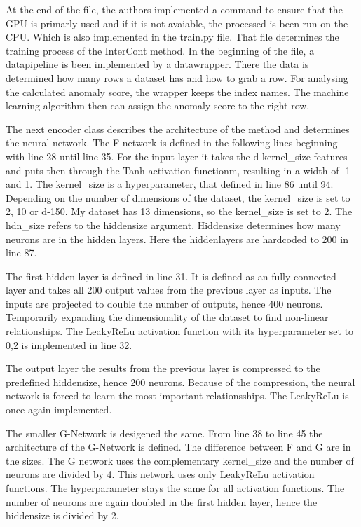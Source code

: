 At the end of the file, the authors implemented a command to ensure that the GPU is primarly used and if it is not avaiable, the processed is been run on the CPU.
Which is also implemented in the train.py file. 
That file determines the training process of the InterCont method.
In the beginning of the file, a datapipeline is been implemented by a datawrapper. 
There the data is determined how many rows a dataset has and how to grab a row. 
For analysing the calculated anomaly score, the wrapper keeps the index names.
The machine learning algorithm then can assign the anomaly score to the right row.


The next encoder class describes the architecture of the method and determines the neural network.
The F network is defined in the following lines beginning with line 28 until line 35.
For the input layer it takes the d-kernel\_size features and puts then through the Tanh activation functionm, resulting in a width of -1 and 1.
The kernel\_size is a hyperparameter, that defined in line 86 until 94. 
Depending on the number of dimensions of the dataset, the kernel\_size is set to 2, 10 or d-150. 
My dataset has 13 dimensions, so the kernel\_size is set to 2.
The hdn\_size refers to the hiddensize argument.
Hiddensize determines how many neurons are in the hidden layers.
Here the hiddenlayers are hardcoded to 200 in line 87. 


The first hidden layer is defined in line 31.
It is defined as an fully connected layer and takes all 200 output values from the previous layer as inputs.
The inputs are projected to double the number of outputs, hence 400 neurons.
Temporarily expanding the dimensionality of the dataset to find non-linear relationships.
The LeakyReLu activation function with its hyperparameter set to 0,2 is implemented in line 32.


The output layer the results from the previous layer is compressed to the predefined hiddensize, hence 200 neurons. 
Because of the compression, the neural network is forced to learn the most important relationsships.
The LeakyReLu is once again implemented.


The smaller G-Network is desigened the same.
From line 38 to line 45 the architecture of the G-Network is defined.
The difference between F and G are in the sizes.
The G network uses the complementary kernel\_size and the number of neurons are divided by 4. 
This network uses only LeakyReLu activation functions.
The hyperparameter stays the same for all activation functions.
The number of neurons are again doubled in the first hidden layer, hence the hiddensize is divided by 2.

